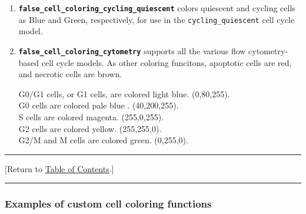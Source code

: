 \documentclass[12pt]{article}
\newcommand{\beq}{\begin{equation}}
\newcommand{\eeq}{\end{equation}}
\newcommand{\smallcode}[1]{\textbf{\texttt{#1}}}
\newcommand{\red}[1]{\textcolor{red}{#1}}
\newcommand{\TOClink}{\begin{center}\hrule\vskip-5pt\phantom{.}\hfill[Return to \hyperlink{TOC}{Table of Contents}.]\hfill\phantom{.}\vskip3pt\hrule\end{center}}
\begin{document}
\begin{enumerate}
The nucleus is colored by virtual hematoxylin staining, with incoming 
light color white (255,255,255), hematoxylin absorb color 
(49.90,51.00,20.40) \cite{ref:H_and_E}, 
and a stain intensity given by 
%
\beq
\texttt{stain} = 
 \frac{ \texttt{pCell->phenotype.volume.nuclear\_solid} }
 { \texttt{pCell->phenotype.volume.nuclear} + 10^{-10} }, 
\eeq
%
which approximates the process of staining nuclear solids with hematoxylin, and 
the water fraction remaining unstained.

All outlines match the corresponding fill colors. 



\item
\smallcode{false\_cell\_coloring\_cycling\_quiescent} colors quiescent and cycling cells as Blue and Green, 
respectively, for use in the \texttt{cycling\_quiescent} cell cycle model. 

\item
\smallcode{false\_cell\_coloring\_cytometry} supports all the various flow cytometry-based cell 
cycle models.  As other coloring funcitons, apoptotic cells are red, and necrotic cells are brown. 

G0/G1 cells, or G1 cells, are colored light blue. (0,80,255). \\
G0 cells are colored pale blue . (40,200,255). \\
S cells are colored magenta. (255,0,255). \\
G2 cells are colored yellow. (255,255,0). \\
G2/M and M cells are colored green. (0,255,0). 


\end{enumerate}

\TOClink 

\subsubsection{Examples of custom cell coloring functions}
\end{document}
